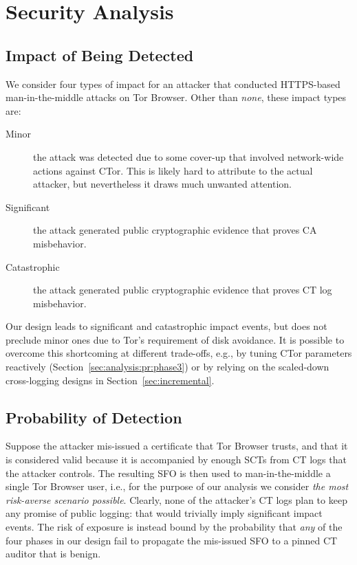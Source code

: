 \section{Security Analysis} \label{sec:analysis}

\subsection{Impact of Being Detected} \label{sec:analysis:impact}
We consider four types of impact for an attacker that conducted
HTTPS-based man-in-the-middle attacks on Tor Browser.  Other than \emph{none},
these impact types are:
\begin{description}
	\item[Minor] the attack was detected due to some cover-up that involved
		network-wide actions against CTor.  This is likely hard to attribute to
		the actual attacker, but nevertheless it draws much unwanted attention.
	\item[Significant] the attack generated public cryptographic evidence
		that proves CA misbehavior.
	\item[Catastrophic] the attack generated public cryptographic evidence
		that proves CT log misbehavior.
\end{description}

Our design leads to significant and catastrophic impact events, but does
not preclude minor ones due to Tor's requirement of disk avoidance.  It is
possible to overcome this shortcoming at different trade-offs, e.g., by
tuning CTor parameters reactively (Section~\ref{sec:analysis:pr:phase3}) or by
relying on the scaled-down cross-logging designs in
Section~\ref{sec:incremental}.

\subsection{Probability of Detection} \label{sec:analysis:pr}
Suppose the attacker mis-issued a certificate that Tor Browser trusts, and that
it is considered valid because it is accompanied by enough SCTs from CT logs
that the attacker controls.  The resulting SFO is then used to man-in-the-middle
a single Tor Browser user, i.e., for the purpose of our analysis we consider
\emph{the most risk-averse scenario possible}.  Clearly, none of the attacker's
CT logs plan to keep any promise of public logging:
	that would trivially imply significant impact events.
The risk of exposure is instead bound by the probability that \emph{any} of the
four phases in our design fail to propagate the mis-issued SFO to a pinned CT
auditor that is benign.


